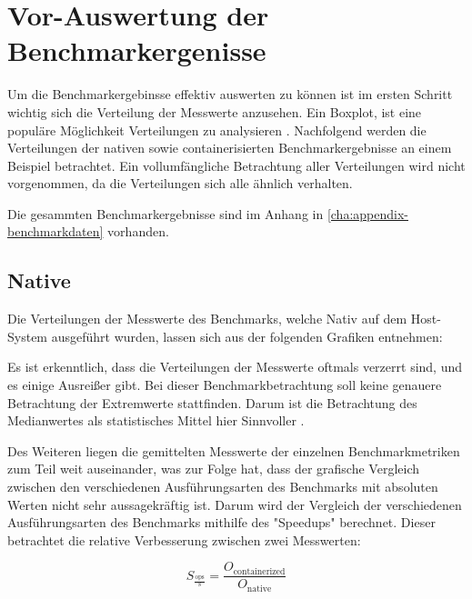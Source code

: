 \section{Vor-Auswertung der Benchmarkergenisse}

Um die Benchmarkergebinsse effektiv auswerten zu können ist im ersten Schritt wichtig sich die Verteilung der Messwerte anzusehen. Ein Boxplot, ist eine populäre Möglichkeit Verteilungen zu analysieren \cite[Vgl. 1]{majawExploringDataDistributions2023}. Nachfolgend werden die Verteilungen der nativen sowie containerisierten Benchmarkergebnisse an einem Beispiel betrachtet. Ein vollumfängliche Betrachtung aller Verteilungen wird nicht vorgenommen, da die Verteilungen sich alle ähnlich verhalten.

Die gesammten Benchmarkergebnisse sind im Anhang in \cref{cha:appendix-benchmarkdaten} vorhanden.

\pagebreak

\subsection{Native}

Die Verteilungen der Messwerte des Benchmarks, welche Nativ auf dem Host-System ausgeführt wurden, lassen sich aus der folgenden Grafiken entnehmen:


\FloatBarrier

Es ist erkenntlich, dass die Verteilungen der Messwerte oftmals verzerrt sind, und es einige Ausreißer gibt. Bei dieser Benchmarkbetrachtung soll keine genauere Betrachtung der Extremwerte stattfinden. Darum ist die Betrachtung des Medianwertes als statistisches Mittel hier Sinnvoller \cite[Vgl. 15f.]{stengelStatistikUndAufbereitung2011}. 

Des Weiteren liegen die gemittelten Messwerte der einzelnen Benchmarkmetriken zum Teil weit auseinander, was zur Folge hat, dass der grafische Vergleich zwischen den verschiedenen Ausführungsarten des Benchmarks mit absoluten Werten nicht sehr aussagekräftig ist. Darum wird der Vergleich der verschiedenen Ausführungsarten des Benchmarks mithilfe des "Speedups" berechnet. Dieser betrachtet die relative Verbesserung zwischen zwei Messwerten: 


\begin{equation}
S_{\frac{\text{ops}}{\text{s}}} = \frac{O_{\text{containerized}}}{O_{\text{native}}}
\end{equation}


